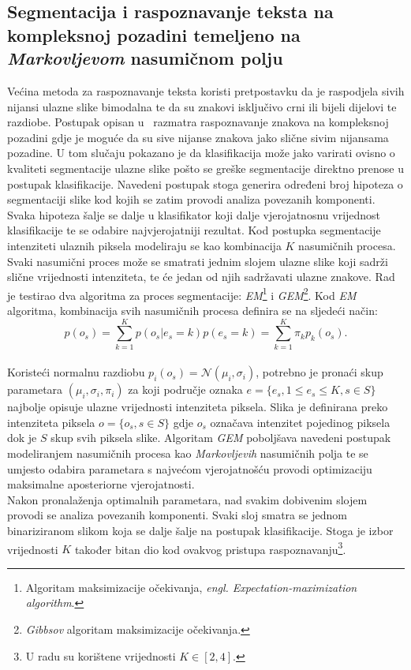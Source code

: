 \subsection{Segmentacija i raspoznavanje teksta na kompleksnoj pozadini temeljeno na \emph{Markovljevom} nasumičnom
polju}
\label{subsec:segmentacija-i-raspoznavanje-teksta-na-kompleksnoj-pozadini-temeljeno-na-markovljevom-nasumicnom-polju}
Većina metoda za raspoznavanje teksta koristi pretpostavku da je raspodjela sivih nijansi ulazne slike bimodalna te da
su znakovi isključivo crni ili bijeli dijelovi te razdiobe. Postupak opisan u\ \citep{chen2002} razmatra raspoznavanje
znakova na kompleksnoj pozadini gdje je moguće da su sive nijanse znakova jako slične sivim nijansama pozadine. U tom
slučaju pokazano je da klasifikacija može jako varirati ovisno o kvaliteti segmentacije ulazne slike pošto se greške
segmentacije direktno prenose u postupak klasifikacije. Navedeni postupak stoga generira određeni broj hipoteza o
segmentaciji slike kod kojih se zatim provodi analiza povezanih komponenti. Svaka hipoteza šalje se dalje u klasifikator
koji dalje vjerojatnosnu vrijednost klasifikacije te se odabire najvjerojatniji rezultat. Kod postupka segmentacije
intenziteti ulaznih piksela modeliraju se kao kombinacija $K$ nasumičnih procesa. Svaki nasumični proces može se
smatrati jednim slojem ulazne slike koji sadrži slične vrijednosti intenziteta, te će jedan od njih sadržavati ulazne
znakove. Rad je testirao dva algoritma za proces segmentacije: \emph{EM}\footnote{Algoritam maksimizacije očekivanja,
\emph{engl. Expectation-maximization algorithm}.} i \emph{GEM}\footnote{\emph{Gibbsov} algoritam maksimizacije
očekivanja.}. Kod \emph{EM} algoritma, kombinacija svih nasumičnih procesa definira se na sljedeći način:\\
\begin{equation*}
    p(o_s) = \sum_{k = 1}^{K} p(o_s | e_s = k) p(e_s = k) = \sum_{k = 1}^{K} \pi_k p_k(o_s).
\end{equation*}
\\
Koristeći normalnu razdiobu $p_i(o_s) = \mathcal{N}(\mu_i, \sigma_i)$, potrebno je pronaći skup parametara
$(\mu_i, \sigma_i, \pi_i)$ za koji područje oznaka $e = \{e_s, 1 \leq e_s \leq K, s \in S\}$ najbolje opisuje ulazne
vrijednosti intenziteta piksela. Slika je definirana preko intenziteta piksela $o = \{o_s, s \in S\}$ gdje $o_s$
označava intenzitet pojedinog piksela dok je $S$ skup svih piksela slike. Algoritam \emph{GEM} poboljšava navedeni
postupak modeliranjem nasumičnih procesa kao \emph{Markovljevih} nasumičnih polja te se umjesto odabira parametara s
najvećom vjerojatnošću provodi optimizaciju maksimalne aposteriorne vjerojatnosti.\\
Nakon pronalaženja optimalnih parametara, nad svakim dobivenim slojem provodi se analiza povezanih komponenti. Svaki
sloj smatra se jednom binariziranom slikom koja se dalje šalje na postupak klasifikacije. Stoga je izbor vrijednosti
$K$ također bitan dio kod ovakvog pristupa raspoznavanju\footnote{U radu su korištene vrijednosti $K \in [2, 4]$.}.

